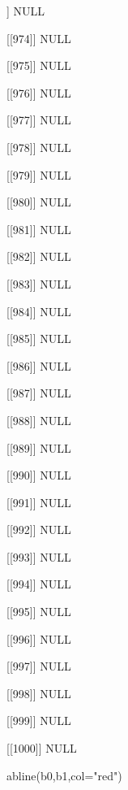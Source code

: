 \begin{Schunk}
\begin{Soutput}
[[973]]
NULL

[[974]]
NULL

[[975]]
NULL

[[976]]
NULL

[[977]]
NULL

[[978]]
NULL

[[979]]
NULL

[[980]]
NULL

[[981]]
NULL

[[982]]
NULL

[[983]]
NULL

[[984]]
NULL

[[985]]
NULL

[[986]]
NULL

[[987]]
NULL

[[988]]
NULL

[[989]]
NULL

[[990]]
NULL

[[991]]
NULL

[[992]]
NULL

[[993]]
NULL

[[994]]
NULL

[[995]]
NULL

[[996]]
NULL

[[997]]
NULL

[[998]]
NULL

[[999]]
NULL

[[1000]]
NULL
\end{Soutput}
\begin{Sinput}
 abline(b0,b1,col="red")
\end{Sinput}
\end{Schunk}
